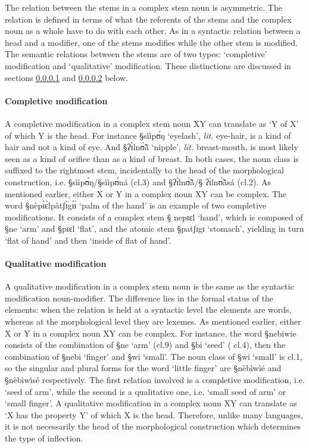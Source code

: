 The relation between the stems in a complex stem noun is asymmetric.  The
relation is defined in terms of what the referents of the stems and the complex
noun as a whole have to do with each other.  As in a syntactic relation
between a head and a modifier, one of the stems modifies while the other stem is
modified. The semantic relations between the stems  are of two types:
 `completive' modification and  `qualitative' modification. These distinctions
are discussed in  sections \ref{sec:GRM-comp-completive} and
\ref{sec:GRM-comp-quality} below.



\paragraph{Completive modification}
\label{sec:GRM-comp-completive}

A completive modification in a complex stem noun XY can translate as `Y of X' of
which Y is the head. For instance {\S sììpʊ́ŋ}   `eyelash', {\it lit.}
eye-hair, is a kind of hair and not a kind of eye. And {\S ʔɪ̀lnʊ̃̀ã̀}
`nipple', {\it lit.} breast-mouth, is most likely seen as a kind of orifice than
as  a kind of breast.  In both cases, the noun class is suffixed to the
rightmost stem, incidentally to the head of the morphological construction, i.e.
{\S sììpʊ́ŋ}/{\S sììpʊ́ná} {\sc (cl.3)} and {\S ʔɪ̀lnʊ̃̀ã̀}/{\S
ʔɪ̀lnʊ̃̀ã̀sá} {\sc (cl.2)}. As mentioned earlier,  either X or Y  in a complex
noun XY can be complex. The word {\S nèpɪ́ɛ̀lpàtʃɪ́gɪ́ɪ́} `palm of the hand'
is an example of two completive modifications. It consists of a complex stem {\S
nepɪɛl} `hand', which is composed of  {\S ne} `arm' and {\S pɪɛl} `flat', and
the atomic stem {\S patʃɪgɪ} `stomach', yielding in turn  `flat of hand' and
then `inside of flat of hand'. 


\paragraph{Qualitative modification}
\label{sec:GRM-comp-quality}

A qualitative modification in a complex stem noun is the same as the  syntactic
modification  noun-modifier. The difference lies in the formal status of the
elements: when the
relation is held at a syntactic level the elements are words, whereas at the
morphological level they are lexemes. As mentioned earlier,  either X or Y  in a
complex noun XY can be complex. For instance, the word {\S nebiwie} consists of
the combination of {\S ne}  `arm' ({\sc cl.9}) and {\S bi} `seed'    ({\sc
cl.4}), then the combination of {\S nebi} `finger' and {\S wi} `small'. The 
noun class  of {\S wi} `small'  is {\sc cl.1}, so the singular and plural
forms for the word `little finger' are {\S nèbìwìé} and  {\S nèbìwìsé}
respectively. The first relation involved is a completive modification, i.e.
`seed  of arm', while the second is a qualitative one, i.e. `small seed  of
arm' or `small finger'.  A qualitative modification in a complex noun XY can
translate as `X has
the property Y'  of which X is the head. Therefore, unlike many languages,  it
is not necessarily the head of the morphological construction which determines
the type of inflection.


